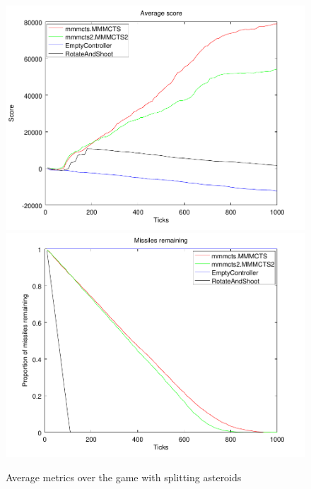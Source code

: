 \begin{figure}
	\caption{Average metrics over the game with splitting asteroids}
	\center
	\includegraphics[scale=0.25]{resources/score_0.pdf}
	\includegraphics[scale=0.25]{resources/missiles_0.pdf}
\end{figure}